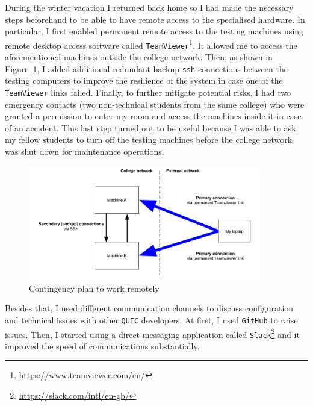 \documentclass[12pt,a4paper,twoside,openright]{report}
\begin{document}
    During the winter vacation I returned back home so I had made the necessary steps beforehand to be able to have remote access to the specialised hardware.
    In particular, I first enabled permanent remote access to the testing machines using remote desktop access software called \texttt{TeamViewer}\footnote{\url{https://www.teamviewer.com/en/}}.
    It allowed me to access the aforementioned machines outside the college network.
    Then, as shown in Figure~\ref{fig:setup_map}, I added additional redundant backup \texttt{ssh} connections between the testing computers to improve the resilience of the system in case one of the \texttt{TeamViewer} links failed.
    Finally, to further mitigate potential risks, I had two emergency contacts (two non-technical students from the same college) who were granted a permission to enter my room and access the machines inside it in case of an accident.
    This last step turned out to be useful because I was able to ask my fellow students to turn off the testing machines before the college network was shut down for maintenance operations.
    

    \begin{figure}[ht]
    \centering
    \includegraphics[width=0.9\textwidth]{figs/Setup map.png}
    \caption{Contingency plan to work remotely}
    \label{fig:setup_map}
    \end{figure}

    Besides that, I used different communication channels to discuss configuration and technical issues with other \texttt{QUIC} developers.
    At first, I used \texttt{GitHub} to raise issues.
    Then, I started using a direct messaging application called \texttt{Slack}\footnote{\url{https://slack.com/intl/en-gb/}} 
    and it improved the speed of communications substantially.
\end{document}
